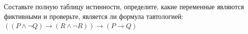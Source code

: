\question Составьте полную таблицу истинности, определите, какие переменные являются фиктивными и проверьте, является ли формула тавтологией:
$(( P \land \neg Q) \rightarrow (R \land \neg R)) \rightarrow (P \rightarrow Q)$